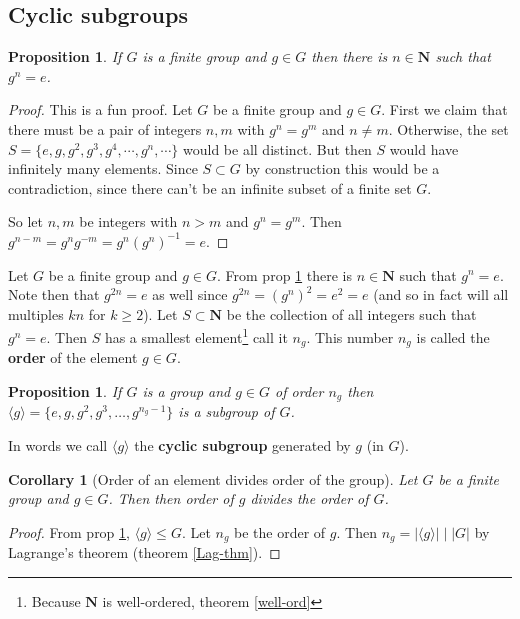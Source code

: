 \documentclass[12pt]{article}
\numberwithin{equation}{subsection}
\newtheorem{prop}[subsection]{Proposition}
\newtheorem{corollary}[subsection]{Corollary}
\theoremstyle{note}
\begin{document}
\subsection{Cyclic subgroups}
\begin{prop}\label{order-of-g}
	If $G$ is a finite group and $g\in G$ then there is $n\in\mathbf{N}$ such that $g^n=e$. 
\end{prop} 

\begin{proof}
	This is a fun proof. Let $G$ be a finite group and $g\in G$. First we claim that there must be a pair of integers $n,m$ with $g^n=g^m$ and $n\neq m$. Otherwise, the set $S=\{e,g,g^2,g^3,g^4,\cdots, g^n,\cdots\}$ would be all distinct. But then $S$ would have infinitely many elements. Since $S\subset G$ by construction this would be a contradiction, since there can't be an infinite subset of a finite set $G$. 
	
	So let $n,m$ be integers with $n>m$ and $g^n=g^m$. Then $ g^{n-m}=g^ng^{-m}=g^n(g^n)^{-1}=e$.
\end{proof}

Let $G$ be a finite group and $g\in G$. From prop \ref{order-of-g} there is $n\in \mathbf{N}$ such that $g^n=e$. Note then that $g^{2n}=e$ as well since $g^{2n}=(g^{n})^2=e^2=e$ (and so in fact will all multiples $kn$ for $k\geq 2$). Let $S\subset \mathbf{N}$ be the collection of all integers such that $g^n=e$. Then $S$ has a smallest element\footnote{Because $\mathbf{N}$ is well-ordered, theorem \ref{well-ord} } call it $n_g$. This number $n_g$ is called the \textbf{order} of the element $g\in G$. 

\begin{prop} \label{cyclic-g}
	If $G$ is a group and $g\in G$ of order $n_g$ then $\langle g\rangle=\{e,g,g^2,g^3,\dots,g^{n_g-1}\}$ is a subgroup of $G$. 
\end{prop}

In words we call $\langle g\rangle$ the \textbf{cyclic subgroup} generated by $g$ (in $G$). 

\begin{corollary}[Order of an element divides order of the group]
	Let $G$ be a finite group and $g\in G$. Then then order of $g$ divides the order of $G$.
\end{corollary}

\begin{proof}
	From prop \ref{cyclic-g}, $\langle g\rangle \leq G$. Let $n_g$ be the order of $g$. Then $n_g=|\langle g\rangle |\mid |G|$ by Lagrange's theorem (theorem \ref{Lag-thm}).
\end{proof}
\end{document}
